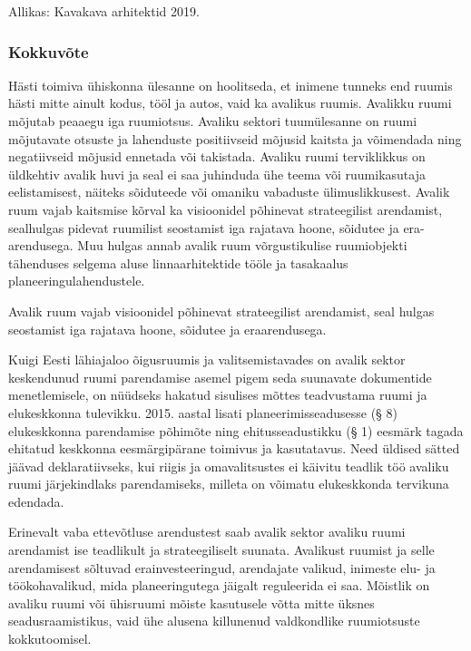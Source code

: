 \documentclass[estonian,]{article}
\begin{document}
\begin{imgsource}
{Allikas:} Kavakava arhitektid 2019.
\end{imgsource}

\hypertarget{kokkuvuxf5te-3}{%
\subsubsection*{Kokkuvõte}\label{kokkuvuxf5te-3}}

Hästi toimiva ühiskonna ülesanne on hoolitseda, et inimene tunneks end ruumis hästi mitte ainult kodus, tööl ja autos, vaid ka avalikus ruumis. Avalikku ruumi mõjutab peaaegu iga ruumiotsus. Avaliku sektori tuumülesanne on ruumi mõjutavate otsuste ja lahenduste positiivseid mõjusid kaitsta ja võimendada ning negatiivseid mõjusid ennetada või takistada. Avaliku ruumi terviklikkus on üldkehtiv avalik huvi ja seal ei saa juhinduda ühe teema või ruumikasutaja eelistamisest, näiteks sõiduteede või omaniku vabaduste ülimuslikkusest. Avalik ruum vajab kaitsmise kõrval ka visioonidel põhinevat strateegilist arendamist, sealhulgas pidevat ruumilist seostamist iga rajatava hoone, sõidutee ja era-arendusega. Muu hulgas annab avalik ruum võrgustikulise ruumiobjekti tähenduses selgema aluse linnaarhitektide tööle ja tasakaalus planeeringulahendustele.

\begin{blockquote-left}
Avalik ruum vajab visioonidel põhinevat strateegilist arendamist, seal
hulgas seostamist iga rajatava hoone, sõidutee ja eraarendusega.
\end{blockquote-left}

Kuigi Eesti lähiajaloo õigusruumis ja valitsemistavades on avalik sektor keskendunud ruumi parendamise asemel pigem seda suunavate dokumentide menetlemisele, on nüüdseks hakatud sisulises mõttes teadvustama ruumi ja elukeskkonna tulevikku. 2015. aastal lisati planeerimisseadusesse (§ 8) elukeskkonna parendamise põhimõte ning ehitusseadustikku (§ 1) eesmärk tagada ehitatud keskkonna eesmärgipärane toimivus ja kasutatavus. Need üldised sätted jäävad deklaratiivseks, kui riigis ja omavalitsustes ei käivitu teadlik töö avaliku ruumi järjekindlaks parendamiseks, milleta on võimatu elukeskkonda tervikuna edendada.

Erinevalt vaba ettevõtluse arendustest saab avalik sektor avaliku ruumi arendamist ise teadlikult ja strateegiliselt suunata. Avalikust ruumist ja selle arendamisest sõltuvad erainvesteeringud, arendajate valikud, inimeste elu- ja töökohavalikud, mida planeeringutega jäigalt reguleerida ei saa. Mõistlik on avaliku ruumi või ühisruumi mõiste kasutusele võtta mitte üksnes seadusraamistikus, vaid ühe alusena killunenud valdkondlike ruumiotsuste kokkutoomisel.
\end{document}
